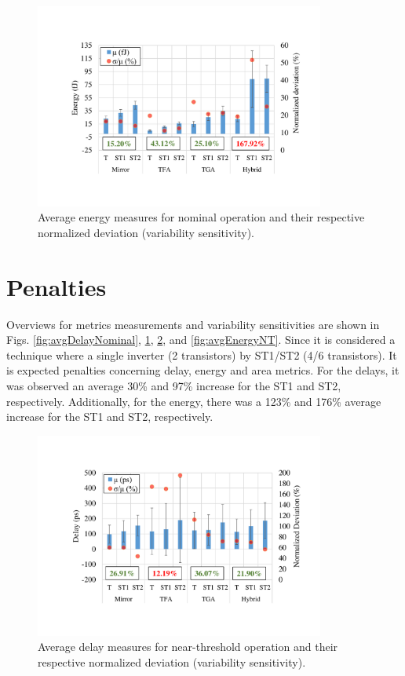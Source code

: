 \documentclass[pgmicro,diss,english]{iiufrgs}
\begin{document}
\begin{figure}[h]
  \centering
    \includegraphics[width=0.85\textwidth, trim={3.5cm 3cm 2cm 3.5cm}, clip]{averageEnergyNominal.pdf}
     \caption{Average energy measures for nominal operation and their respective normalized deviation (variability sensitivity).}
  \label{fig:avgEnergyNominal}
\end{figure}

\section{Penalties}

Overviews for metrics measurements and variability sensitivities are shown in Figs. \ref{fig:avgDelayNominal}, \ref{fig:avgEnergyNominal}, \ref{fig:avgDelayNT}, and \ref{fig:avgEnergyNT}. Since it is considered a technique where a single inverter (2 transistors) by ST1/ST2 (4/6 transistors). It is expected penalties concerning delay, energy and area metrics. For the delays, it was observed an average 30\% and 97\% increase for the ST1 and ST2, respectively. Additionally, for the energy, there was a 123\% and 176\% average increase for the ST1 and ST2, respectively.

\begin{figure}[t]
  \centering
    \includegraphics[width=0.85\textwidth, trim={3.5cm 3cm 2cm 3.5cm}, clip]{averageDelayNT.pdf}
     \caption{Average delay measures for near-threshold operation and their respective normalized deviation (variability sensitivity).}
  \label{fig:avgDelayNT}
\end{figure}
\end{document}
